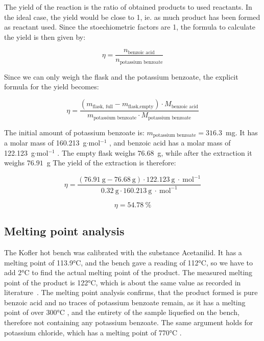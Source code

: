 \documentclass{article}
\begin{document}
The yield of the reaction is the ratio of obtained products to used reactants. In the ideal case, the yield would be close to 1, ie. as much product has been formed as reactant used. Since the stoechiometric factors are 1, the formula to calculate the yield is then given by:

\begin{equation}
    \eta = \frac{n_{\text{benzoic acid}}}{n_{\text{potassium benzoate}}}
    \label{eq:yieldFormula}
\end{equation}

Since we can only weigh the flask and the potassium benzoate, the explicit formula for the yield becomes:

\begin{equation}
    \eta = \frac{(m_{\text{flask, full}}-m_{\text{flask,empty}}) \cdot M_{\text{benzoic acid}}}{m_{\text{potassium benzoate}} \cdot M_{\text{potassium benzoate}}}
\end{equation}

The initial amount of potassium benzoate is: $m_{\text{potassium benzoate}} = 316.3$~mg. It has a molar mass of 160.213~g$\cdot$mol$^{-1}$ \cite{potassiumBenzoate}, and benzoic acid has a molar mass of 122.123~g$\cdot$mol$^{-1}$ \cite{benzoicAcid}. The empty flask weighs $76.68$~g, while after the extraction it weighs $76.91$~g The yield of the extraction is therefore:

\begin{equation*}
    \eta = \frac{(76.91~\text{g}-76.68~\text{g}) \cdot 122.123~\text{g}~\cdot~\text{mol}^{-1} }{0.32~\text{g} \cdot 160.213~\text{g}~\cdot~\text{mol}^{-1}} 
\end{equation*}

\begin{equation*}
    \boxed{ \eta = 54.78~\%}
\end{equation*}

\subsection{Melting point analysis}

The Kofler hot bench was calibrated with the substance Acetanilid. It has a melting point of 113.9°C, and the bench gave a reading of 112°C, so we have to add 2°C to find the actual melting point of the product. The measured melting point of the product is 122°C, which is about the same value as recorded in literature~\cite{MPBenzoicAcid}. The melting point analysis confirms, that the product formed is pure benzoic acid and no traces of potassium benzoate remain, as it has a melting point of  over 300°C \cite{potassiumBenzoate}, and the entirety of the sample liquefied on the bench, therefore not containing any potassium benzoate. The same argument holds for potassium chloride, which has a melting point of 770°C \cite{potassiumChloride}.
\end{document}
